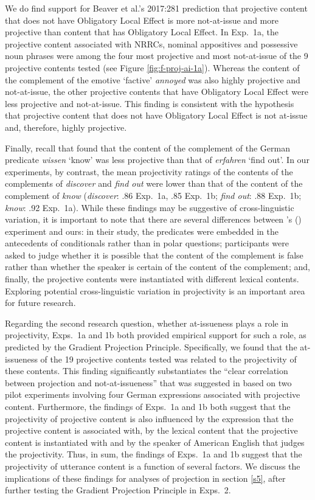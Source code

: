 \documentclass[11pt,fleqn]{article}
\newcommand{\6}{\mbox{$[\hspace*{-.6mm}[$}}
\newcommand{\9}{\mbox{$]\hspace*{-.6mm}]$}}
\newcommand{\citetpos}[1]{\citeauthor{#1}'s (\citeyear{#1})}
\begin{document}
We do find support for Beaver et al.'s 2017:281 prediction that projective content that does not have Obligatory Local Effect is more not-at-issue and more projective than content that has Obligatory Local Effect. In Exp.~1a, the projective content associated with NRRCs, nominal appositives and possessive noun phrases were among the four most projective and most not-at-issue of the 9 projective contents tested (see Figure \ref{fig:f-proj-ai-1a}). Whereas the content of the complement of the emotive `factive' {\em annoyed} was also highly projective and not-at-issue, the other projective contents that have Obligatory Local Effect were less projective and not-at-issue. This finding is consistent with the hypothesis that projective content that does not have Obligatory Local Effect is not at-issue and, therefore, highly projective. 

Finally, recall that \citet{xue-onea11} found that the content of the complement of the German predicate {\em wissen} `know' was less projective than that of {\em erfahren} `find out'. In our experiments, by contrast, the mean projectivity ratings of the contents of the complements of {\em discover} and {\em find out} were lower  than that of the content of the complement of {\em know} ({\em discover}: .86 Exp.~1a, .85 Exp.~1b; {\em find out}: .88 Exp.~1b; {\em know}: .92 Exp.~1a). While these findings may be suggestive of cross-linguistic variation, it is important to note that there are several differences between \citetpos{xue-onea11} experiment and ours: in their study, the predicates were embedded in the antecedents of conditionals rather than in polar questions; participants were asked to judge whether it is possible that the content of the complement is false rather than whether the speaker is certain of the content of the complement; and, finally, the projective contents were instantiated with different lexical contents. Exploring potential cross-linguistic variation in projectivity is an important area for future research.

Regarding the second research question, whether at-issueness plays a role in projectivity, Exps.~1a and 1b both provided empirical support for such a role, as predicted by  the Gradient Projection Principle. Specifically, we found that the at-issueness  of the 19 projective contents tested was related to the projectivity of these contents. This finding significantly substantiates the ``clear correlation between projection and not-at-issueness'' that was suggested in \citealt[180]{xue-onea11} based on two pilot experiments involving four German expressions associated with projective content. Furthermore, the findings of Exps.~1a and 1b both suggest that the projectivity of projective content is also influenced by the expression that the projective content is associated with, by the lexical content that the projective content is instantiated with and by the speaker of American English that judges the projectivity.  Thus, in sum, the findings of Exps.~1a and 1b suggest that the projectivity of utterance content is a function of several factors. We discuss the implications of these findings for analyses of projection in section \ref{s5}, after further testing the Gradient Projection Principle in Exps.~2.
\end{document}
